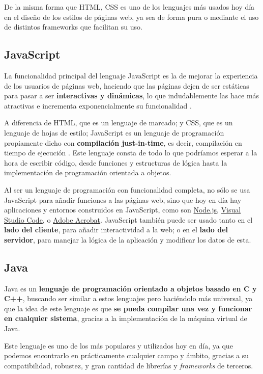 De la misma forma que HTML, CSS es uno de los lenguajes más usados hoy día en el diseño de los estilos de páginas web, ya sea de forma pura o mediante el uso de distintos frameworks que facilitan su uso.

\subsection{JavaScript}

La funcionalidad principal del lenguaje JavaScript es la de mejorar la experiencia de los usuarios de páginas web, haciendo que las páginas dejen de ser estáticas para pasar a ser \textbf{interactivas y dinámicas}, lo que indudablemente las hace más atractivas e incrementa exponencialmente su funcionalidad \cite{aws:javascript}.

A diferencia de HTML, que es un lenguaje de marcado; y CSS, que es un lenguaje de hojas de estilo; JavaScript es un lenguaje de programación propiamente dicho con \textbf{compilación just-in-time}, es decir, compilación en tiempo de ejecución \cite{mdn:javascript}. Este lenguaje consta de todo lo que podríamos esperar a la hora de escribir código, desde funciones y estructuras de lógica hasta la implementación de programación orientada a objetos.

Al ser un lenguaje de programación con funcionalidad completa, no sólo se usa JavaScript para añadir funciones a las páginas web, sino que hoy en día hay aplicaciones y entornos construidos en JavaScript, como son \href{https://nodejs.org/en}{Node.js}, \href{https://code.visualstudio.com/}{Visual Studio Code}, o \href{https://www.adobe.com/es/acrobat.html}{Adobe Acrobat}. JavaScript también puede ser usado tanto en el \textbf{lado del cliente}, para añadir interactividad a la web; o en el \textbf{lado del servidor}, para manejar la lógica de la aplicación y modificar los datos de esta.

\subsection{Java}

Java es un \textbf{lenguaje de programación orientado a objetos basado en C y C++}, buscando ser similar a estos lenguajes pero haciéndolo más universal, ya que la idea de este lenguaje es que \textbf{se pueda compilar una vez y funcionar en cualquier sistema}, gracias a la implementación de la máquina virtual de Java.

 Este lenguaje es uno de los más populares y utilizados hoy en día, ya que podemos encontrarlo en prácticamente cualquier campo y ámbito, gracias a su compatibilidad, robustez, y gran cantidad de librerías y \textit{frameworks} de terceros. \cite{aws:java}
 
